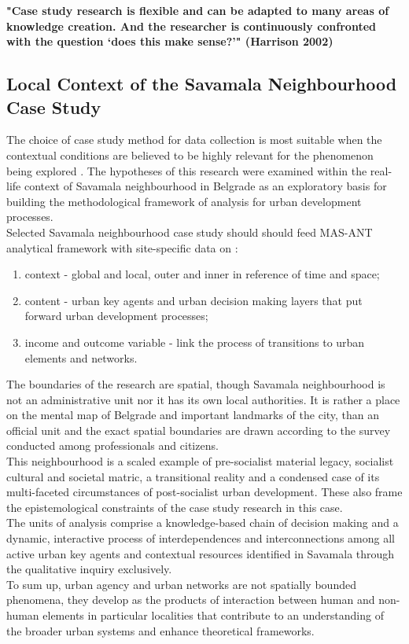 \documentclass[11pt]{report}
\begin{document}
\textbf{"Case study research is flexible and can be adapted to many areas of knowledge creation. And the researcher is continuously confronted with the question ‘does this make sense?’" (Harrison 2002)}

\subsection{Local Context of the Savamala Neighbourhood Case Study}

The choice of case study method for data collection is most suitable when
the  contextual  conditions  are  believed  to  be highly relevant for the phenomenon being explored . The hypotheses of this research were examined within the real-life context of Savamala neighbourhood in Belgrade as an exploratory basis for building the methodological framework of analysis for urban development processes. 
\\
Selected Savamala neighbourhood case study should should feed MAS-ANT analytical framework with site-specific data on :
\begin{enumerate}
\item context - global and local, outer and inner in reference of time and space;
\item content - urban key agents and urban decision making layers that put forward urban development processes;
\item income and outcome variable - link the process of transitions to urban elements and networks.
\end{enumerate}

The boundaries of the research are spatial, though Savamala neighbourhood is not an administrative unit nor it has its own local authorities. It is rather a place on the mental map of Belgrade and important landmarks of the city, than an official unit and the exact spatial boundaries are drawn according to the survey conducted among professionals and citizens.
\\
This neighbourhood is a scaled example of pre-socialist material legacy, socialist cultural and societal matric, a transitional reality and a condensed case of its multi-faceted circumstances of post-socialist urban development. These also frame the epistemological constraints of the case study research in this case.
\\
The units of analysis comprise a knowledge-based chain of decision making and a dynamic, interactive process of interdependences and interconnections among all active urban key agents and contextual resources identified in Savamala through the qualitative inquiry exclusively.
\\
To sum up, urban agency and urban networks are not spatially bounded phenomena, they develop as the products of interaction between human and non-human elements in  particular localities that contribute to an understanding of the broader urban systems and enhance theoretical frameworks. 
\end{document}
